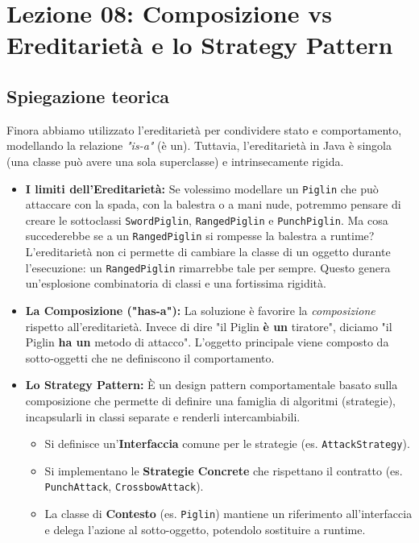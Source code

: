 \documentclass[12pt, a4paper]{article}
\begin{document}
\section{Lezione 08: Composizione vs Ereditarietà e lo Strategy Pattern}

\subsection{Spiegazione teorica}
Finora abbiamo utilizzato l'ereditarietà per condividere stato e comportamento, modellando la relazione \textit{"is-a"} (è un). Tuttavia, l'ereditarietà in Java è singola (una classe può avere una sola superclasse) e intrinsecamente rigida. 

\begin{itemize}
    \item \textbf{I limiti dell'Ereditarietà:} Se volessimo modellare un \texttt{Piglin} che può attaccare con la spada, con la balestra o a mani nude, potremmo pensare di creare le sottoclassi \texttt{SwordPiglin}, \texttt{RangedPiglin} e \texttt{PunchPiglin}. Ma cosa succederebbe se a un \texttt{RangedPiglin} si rompesse la balestra a runtime? L'ereditarietà non ci permette di cambiare la classe di un oggetto durante l'esecuzione: un \texttt{RangedPiglin} rimarrebbe tale per sempre. Questo genera un'esplosione combinatoria di classi e una fortissima rigidità.
    \item \textbf{La Composizione ("has-a"):} La soluzione è favorire la \textit{composizione} rispetto all'ereditarietà. Invece di dire "il Piglin \textbf{è un} tiratore", diciamo "il Piglin \textbf{ha un} metodo di attacco". L'oggetto principale viene composto da sotto-oggetti che ne definiscono il comportamento.
    \item \textbf{Lo Strategy Pattern:} È un design pattern comportamentale basato sulla composizione che permette di definire una famiglia di algoritmi (strategie), incapsularli in classi separate e renderli intercambiabili. 
    \begin{itemize}
        \item Si definisce un'\textbf{Interfaccia} comune per le strategie (es. \texttt{AttackStrategy}).
        \item Si implementano le \textbf{Strategie Concrete} che rispettano il contratto (es. \texttt{PunchAttack}, \texttt{CrossbowAttack}).
        \item La classe di \textbf{Contesto} (es. \texttt{Piglin}) mantiene un riferimento all'interfaccia e delega l'azione al sotto-oggetto, potendolo sostituire a runtime.
    \end{itemize}
\end{itemize}
\end{document}
